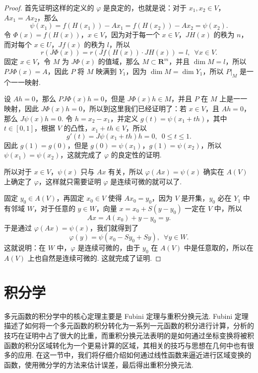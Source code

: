 \begin{proof}
    首先证明这样的定义的 $\varphi$ 是良定的，也就是说：对于 $x_1, x_2\in V$，$Ax_1 = Ax_2$，那么 \[\psi(x_1) = f(H(x_1)) - Ax_1 = f(H(x_2)) - Ax_2 = \psi(x_2).\]
    令 $\Phi(x) = f(H(x))$，$x\in V$，因为对于每一个 $x\in V$，$JH(x)$ 的秩为 $n$，而对每个 $x\in U$，$Jf(x)$ 的秩为 $l$，所以 \[r(J\Phi(x)) = r(Jf(H(x))\cdot JH(x)) = l, \enspace \forall x \in V.\]
    固定 $x\in V$，令 $M$ 为 $J\Phi(x)$ 的值域，那么 $M\subset \mathbf{R}^m$，并且 $\dim M = l$，所以 $PJ\Phi(x) = A$，因此 $P$ 将 $M$ 映满到 $Y_1$，因为 $\dim M = \dim Y_1$，所以 $P|_{M}$ 是一个一一映射.

    设 $Ah = 0$，那么 $PJ\Phi(x)h = 0$，但是 $J\Phi(x)h \in M$，并且 $P$ 在 $M$ 上是一一映射，因此 $J\Phi(x)h = 0$，所以到这里我们已经证明了：若 $x\in V$，且 $Ah = 0$，那么 $J\psi(x)h = 0$.
    令 $h = x_2 - x_1$，并定义 $g(t) = \psi(x_1 + th)$，其中 $t\in [0, 1]$，根据 $V$ 的凸性，$x_1 + th\in V$，所以 \[g'(t) = J\psi(x_1 + th)h = 0, \enspace 0 \leqslant t\leqslant 1.\]
    因此 $g(1) = g(0)$，但是 $g(0) = \psi(x_1)$，$g(1) = \psi(x_2)$，所以 $\psi(x_1) = \psi(x_2)$，这就完成了 $\varphi$ 的良定性的证明.

    所以对于 $x\in V$，$\psi(x)$ 只与 $Ax$ 有关，所以 $\varphi(Ax) = \psi(x)$ 确实在 $A(V)$ 上确定了 $\varphi$，这样就只需要证明 $\varphi$ 是连续可微的就可以了.

    固定 $y_0\in A(V)$，再固定 $x_0\in V$ 使得 $Ax_0 = y_0$，因为 $V$ 是开集，$y_0$ 必在 $Y_1$ 中有邻域 $W$，对于任意的 $y\in W$，向量 $x = x_0 + S(y - y_0)$ 一定在 $V$ 中，所以 \[Ax = A(x_0) + y - y_0 = y.\]
    于是通过 $\varphi(Ax) = \psi(x)$，我们就得到了 \[\varphi(y) = \psi(x_0 - Sy_0 + Sy), \enspace \forall y\in W.\]
    这就说明：在 $W$ 中，$\varphi$ 是连续可微的，由于 $y_0$ 在 $A(V)$ 中是任意取的，所以在 $A(V)$ 上也自然是连续可微的. 这就完成了证明.
\end{proof}

\section{积分学}

多元函数的积分学中的核心定理主要是 Fubini 定理与重积分换元法. Fubini 定理描述了如何将一个多元函数的积分转化为一系列一元函数的积分进行计算，分析的技巧在证明中占了很大的比重，而重积分换元法表明的是如何通过坐标变换将被积函数的积分区域转化为一个更易计算的区域，其相关的技巧与思想在几何中也有很多的应用. 在这一节中，我们将仔细介绍如何通过线性函数来逼近进行区域变换的函数，使用微分学的方法来估计误差，最后得出重积分换元法.

